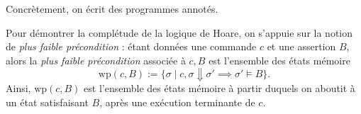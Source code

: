 \documentclass[../main]{subfiles}
\begin{document}
  \begin{rmk}
    Concrètement, on écrit des programmes annotés.
    \begin{figure}[H]
      \centering
    \end{figure}
  \end{rmk}

  Pour démontrer la complétude de la logique de Hoare, on s'appuie sur la notion de \textit{plus faible précondition} : étant données une commande $c$ et une assertion $B$, alors la \textit{plus faible précondition} associée à $c,B$ est  l'ensemble des états mémoire \[
  \mathrm{wp}(c, B) := \{\sigma  \mid c,\sigma \Downarrow \sigma' \implies \sigma' \models B\}
  .\]
  Ainsi, $\mathrm{wp}(c, B)$ est l'ensemble des états mémoire à partir duquels on aboutit à un état satisfaisant $B$, après une exécution terminante de $c$.
\end{document}
